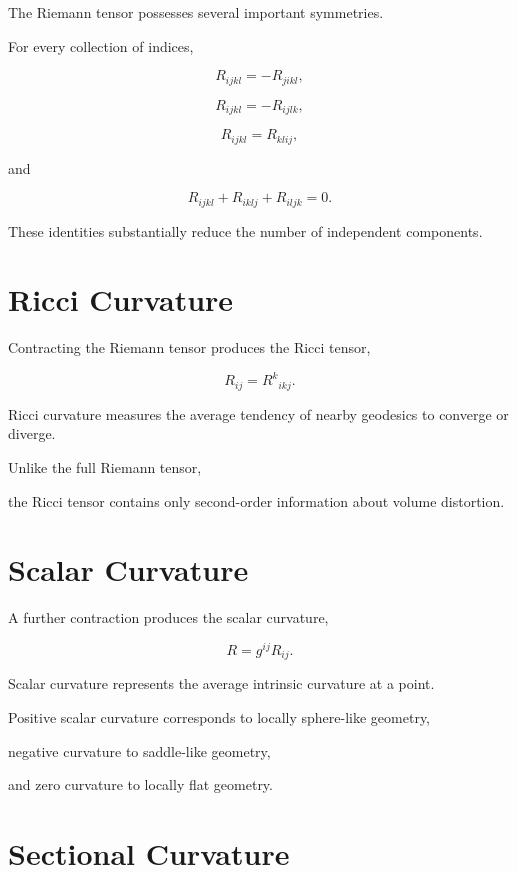 \documentclass[11pt,fleqn]{book}
\numberwithin{equation}{chapter}
\theoremstyle{plain}
\theoremstyle{definition}
\theoremstyle{remark}
\begin{document}
The Riemann tensor possesses several important symmetries.

For every collection of indices,

\[
R_{ijkl}
=
-
R_{jikl},
\]

\[
R_{ijkl}
=
-
R_{ijlk},
\]

\[
R_{ijkl}
=
R_{klij},
\]

and

\[
R_{ijkl}
+
R_{iklj}
+
R_{iljk}
=
0.
\]

These identities substantially reduce the number of independent
components.


\section{Ricci Curvature}

Contracting the Riemann tensor produces the Ricci tensor,

\[
\boxed{
R_{ij}
=
R^k{}_{ikj}.
}
\]

Ricci curvature measures the average tendency of nearby geodesics to
converge or diverge.

Unlike the full Riemann tensor,

the Ricci tensor contains only second-order information about volume
distortion.


\section{Scalar Curvature}

A further contraction produces the scalar curvature,

\[
\boxed{
R
=
g^{ij}R_{ij}.
}
\]

Scalar curvature represents the average intrinsic curvature at a point.

Positive scalar curvature corresponds to locally sphere-like geometry,

negative curvature to saddle-like geometry,

and zero curvature to locally flat geometry.


\section{Sectional Curvature}
\end{document}
